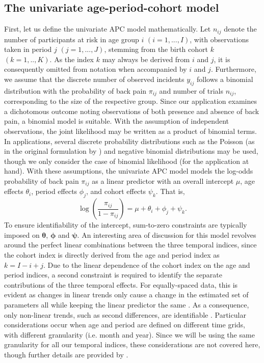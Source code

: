 \subsection{The univariate age-period-cohort model}\label{section:univariateAPC}
First, let us define the univariate APC model mathematically. Let $n_{ij}$ denote the number of participants at risk in age group $i$ $(i = 1,...,I)$, with observations taken in period $j$ $(j = 1,...,J)$, stemming from the birth cohort $k$ $(k=1,..,K)$. As the index $k$ may always be derived from $i$ and $j$, it is consequently omitted from notation when accompanied by $i$ and $j$. Furthermore, we assume that the discrete number of observed incidents $y_{ij}$ follows a binomial distribution with the probability of back pain $\pi_{ij}$ and number of trials $n_{ij}$, corresponding to the size of the respective group. Since our application examines a dichotomous outcome noting observations of both presence and absence of back pain, a binomial model is suitable. With the assumption of independent observations, the joint likelihood may be written as a product of binomial terms. In applications, several discrete probability distributions such as the Poisson (as in the original formulation by \cite{clayton1987models}) and negative binomial distributions may be used, though we only consider the case of binomial likelihood (for the application at hand). With these assumptions, the univariate APC model models the log-odds probability of back pain $\pi_{ij}$ as a linear predictor with an overall intercept $\mu$, age effects $\theta_i$, period effects $\phi_j$, and cohort effects $\psi_k$. That is,
\begin{equation}
    \log\left(\frac{\pi_{ij}}{1-\pi_{ij}}\right) = \mu + \theta_i + \phi_j +\psi_k.
\end{equation} 
To ensure identifiability of the intercept, sum-to-zero constraints are typically imposed on $\pmb \theta$, $\pmb \phi$ and $\pmb \psi$. An interesting area of discussion for this model revolves around the perfect linear combinations between the three temporal indices, since the cohort index is directly derived from the age and period index as $k = I-i+j$. Due to the linear dependence of the cohort index on the age and period indices, a second constraint is required to identify the separate contributions of the three temporal effects. For equally-spaced data, this is evident as changes in linear trends only cause a change in the estimated set of parameters all while keeping the linear predictor the same \citep{riebler2010multivariate}. As a consequence, only non-linear trends, such as second differences, are identifiable \citep{clayton1987models}. Particular considerations occur when age and period are defined on different time grids, with different granularity (i.e. month and year). Since we will be using the same granularity for all our temporal indices, these considerations are not covered here, though  further details are provided by \cite{riebler2010multivariate}.

